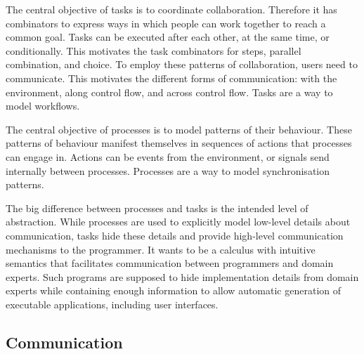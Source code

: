 The central objective of tasks is to coordinate collaboration.
Therefore it has combinators to express ways in which people can work together to reach a common goal.
Tasks can be executed after each other, at the same time, or conditionally.
This motivates the task combinators for steps, parallel combination, and choice.
To employ these patterns of collaboration, users need to communicate.
This motivates the different forms of communication: with the environment, along control flow, and across control flow.
Tasks are a way to model workflows.

The central objective of processes is to model patterns of their behaviour.
These patterns of behaviour manifest themselves in sequences of actions that processes can engage in.
Actions can be events from the environment, or signals send internally between processes.
Processes are a way to model synchronisation patterns.


%
The big difference between processes and tasks is the intended level of abstraction.
While processes are used to explicitly model low-level details about communication, tasks hide these details and provide high-level communication mechanisms to the programmer.
It wants to be a calculus with intuitive semantics that facilitates communication between programmers and domain experts.
Such programs are supposed to hide implementation details from domain experts while containing enough information to allow automatic generation of executable applications, including user interfaces.




\subsection{Communication}

